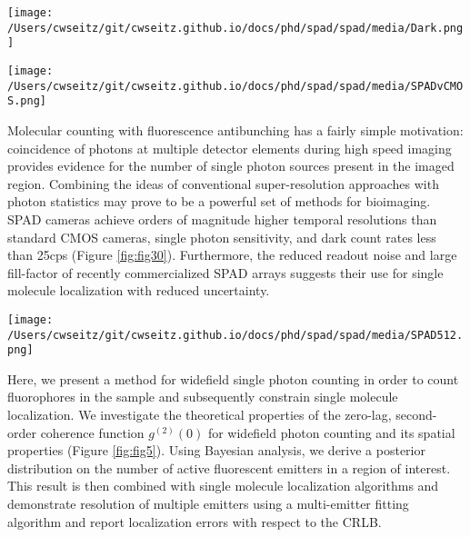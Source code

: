 \begin{figure*}[t]
\centering
\texttt{[image: /Users/cwseitz/git/cwseitz.github.io/docs/phd/spad/spad/media/Dark.png]}
\caption{\textbf{Dark counts of the SPAD array}. (left) Average pixel-wise dark counts for a 100x100 pixel region exposed for 100ms (right) Variance of dark counts for 100ms exposure.}
\label{fig:fig30}
\end{figure*}    


\begin{figure*}[t]
\centering
\texttt{[image: /Users/cwseitz/git/cwseitz.github.io/docs/phd/spad/spad/media/SPADvCMOS.png]}
\caption{\textbf{Comparison of quantum dot images between CMOS and SPAD cameras}. (left) SPAD image of Qdot655 coated on a glass coverslip using a 100X/1.4NA oil-immersion objective (Nikon) and a 10ms exposure time. (right) CMOS image of Qdot655 using a 60X/1.4NA oil-immersion objective (Olympus) and a 10ms exposure time. Both use continuous-wave 640nm excitation}
\label{fig:fig4}
\end{figure*}    

Molecular counting with fluorescence antibunching has a fairly simple motivation: coincidence of photons at multiple detector elements during high speed imaging provides evidence for the number of single photon sources present in the imaged region. Combining the ideas of conventional super-resolution approaches with photon statistics may prove to be a powerful set of methods for bioimaging. SPAD cameras achieve orders of magnitude higher temporal resolutions than standard CMOS cameras, single photon sensitivity, and dark count rates less than 25cps (Figure \ref{fig:fig30}). Furthermore, the reduced readout noise and large fill-factor of recently commercialized SPAD arrays suggests their use for single molecule localization with reduced uncertainty.

\begin{figure*}[t]
\centering
\texttt{[image: /Users/cwseitz/git/cwseitz.github.io/docs/phd/spad/spad/media/SPAD512.png]}
\caption{\textbf{Experimental setup for widefield photon counting}. A 532nm pulsed laser is directed through a spatial filter, galvo mirror, and passed through filtering and focusing optics to a 100X oil-immersion objective. Emission light of a 50$\mu$m grid is projected onto the SPAD512 camera (inset)}
\label{fig:fig5}
\end{figure*}    


Here, we present a method for widefield single photon counting in order to count fluorophores in the sample and subsequently constrain single molecule localization. We investigate the theoretical properties of the zero-lag, second-order coherence function $g^{(2)}(0)$ for widefield photon counting and its spatial properties (Figure \ref{fig:fig5}). Using Bayesian analysis, we derive a posterior distribution on the number of active fluorescent emitters in a region of interest. This result is then combined with single molecule localization algorithms and demonstrate resolution of multiple emitters using a multi-emitter fitting algorithm and report localization errors with respect to the CRLB.

